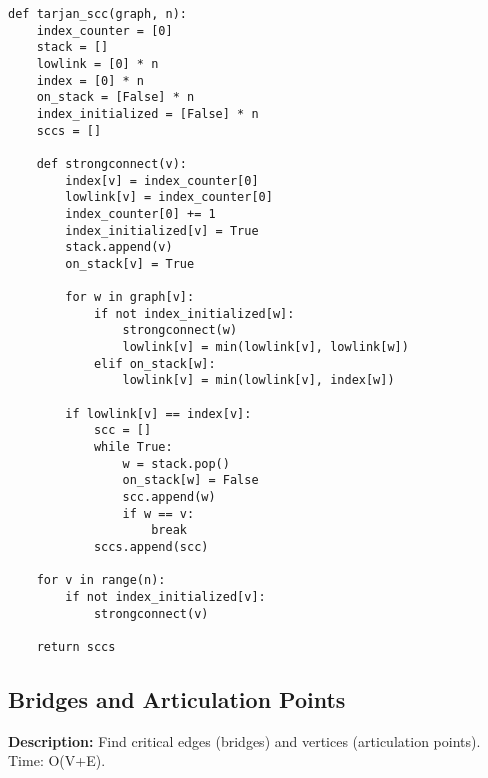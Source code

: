 \begin{lstlisting}
def tarjan_scc(graph, n):
    index_counter = [0]
    stack = []
    lowlink = [0] * n
    index = [0] * n
    on_stack = [False] * n
    index_initialized = [False] * n
    sccs = []
    
    def strongconnect(v):
        index[v] = index_counter[0]
        lowlink[v] = index_counter[0]
        index_counter[0] += 1
        index_initialized[v] = True
        stack.append(v)
        on_stack[v] = True
        
        for w in graph[v]:
            if not index_initialized[w]:
                strongconnect(w)
                lowlink[v] = min(lowlink[v], lowlink[w])
            elif on_stack[w]:
                lowlink[v] = min(lowlink[v], index[w])
        
        if lowlink[v] == index[v]:
            scc = []
            while True:
                w = stack.pop()
                on_stack[w] = False
                scc.append(w)
                if w == v:
                    break
            sccs.append(scc)
    
    for v in range(n):
        if not index_initialized[v]:
            strongconnect(v)
    
    return sccs
\end{lstlisting}

\subsection{Bridges and Articulation Points}
\textbf{Description:} Find critical edges (bridges) and vertices (articulation points). Time: O(V+E).

